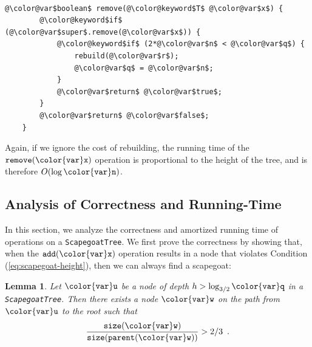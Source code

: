 \documentclass[10pt]{book}
\newcommand{\myeqref}[1]{(\ref{eq:#1})}
\theoremstyle{plain}
\newtheorem{lem}{Lemma}[chapter]
\theoremstyle{definition}
\begin{document}
 \ \vspace{.5ex}\begin{Verbatim}[gobble=1,tabsize=2,frame=single,framerule=1.2pt,commandchars=\\@\$,label=\texttt{ScapegoatTree},labelposition=topline]
	@\color@var$boolean$ remove(@\color@keyword$T$ @\color@var$x$) {
		@\color@keyword$if$ (@\color@var$super$.remove(@\color@var$x$)) {
			@\color@keyword$if$ (2*@\color@var$n$ < @\color@var$q$) {
				rebuild(@\color@var$r$);
				@\color@var$q$ = @\color@var$n$;
			}
			@\color@var$return$ @\color@var$true$;
		}
		@\color@var$return$ @\color@var$false$;
	}
\end{Verbatim}

Again, if we ignore the cost of rebuilding, the running time of the
\ensuremath{\mathtt{remove({\color{var}x})}} operation is proportional to the height of the tree, and is
therefore $O(\log \ensuremath{\mathtt{{\color{var}n}}})$.

\subsection{Analysis of Correctness and Running-Time}

In this section, we analyze the correctness and amortized running time
of operations on a \texttt{ScapegoatTree}.  We first prove the correctness by
showing that, when the \ensuremath{\mathtt{add({\color{var}x})}} operation results in a node that violates
Condition \myeqref{scapegoat-height}, then we can always find a scapegoat:

\begin{lem}
  Let \ensuremath{\mathtt{{\color{var}u}}} be a node of depth $h>\log_{3/2} \ensuremath{\mathtt{{\color{var}q}}}$ in a \texttt{ScapegoatTree}.
  Then there exists a node $\ensuremath{\mathtt{{\color{var}w}}}$ on the path from \ensuremath{\mathtt{{\color{var}u}}} to the root
  such that
  \[
     \frac{\ensuremath{\mathtt{size({\color{var}w})}}}{\ensuremath{\mathtt{size(parent({\color{var}w}))}}} > 2/3 \enspace .
  \]
\end{lem}
\end{document}

